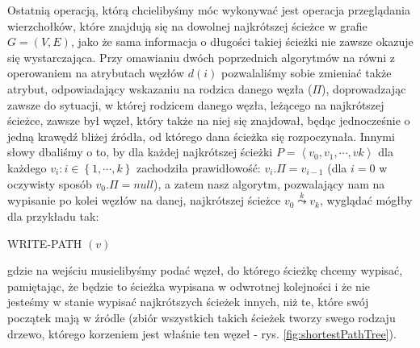 Ostatnią operacją, którą chcielibyśmy móc wykonywać jest operacja przeglądania wierzchołków, które znajdują się na dowolnej najkrótszej ścieżce w grafie $G = \left( V, E \right)$, jako że sama informacja o długości takiej ścieżki nie zawsze okazuje się wystarczająca. Przy omawianiu dwóch poprzednich algorytmów na równi z operowaniem na atrybutach węzłów $d \left( i \right)$ pozwalaliśmy sobie zmieniać także atrybut, odpowiadający wskazaniu na rodzica danego węzła ($\Pi$), doprowadzając zawsze do sytuacji, w której rodzicem danego węzła, leżącego na najkrótszej ścieżce, zawsze był węzeł, który także na niej się znajdował, będąc jednocześnie o jedną krawędź bliżej źródła, od którego dana ścieżka się rozpoczynała. Innymi słowy dbaliśmy o to, by dla każdej najkrótszej ścieżki $ P = \left \langle v_{0}, v_{1}, \cdots, v{k} \right \rangle$ dla każdego $v_{i} : i \in \left\{ 1, \cdots, k \right\}$ zachodziła prawidłowość: $v_{i}.\Pi = v_{i-1}$ (dla $i = 0$ w oczywisty sposób $v_{0}.\Pi = null$), a zatem nasz algorytm, pozwalający nam na wypisanie po kolei węzłów na danej, najkrótszej ścieżce $v_{0} \overset{k} \leadsto v_{k}$, wyglądać mógłby dla przykładu tak:

\begin{algorithm}[!htbp]
\DontPrintSemicolon
{}
\caption{WRITE-PATH $\left( v \right)$ \label{alg:writePAth}}
\end{algorithm}

gdzie na wejściu musielibyśmy podać węzeł, do którego ścieżkę chcemy wypisać, pamiętając, że będzie to ścieżka wypisana w odwrotnej kolejności i że nie jesteśmy w stanie wypisać najkrótszych ścieżek innych, niż te, które swój początek mają w źródle (zbiór wszystkich takich ścieżek tworzy swego rodzaju drzewo, którego korzeniem jest właśnie ten węzeł - rys. \ref{fig:shortestPathTree}).

